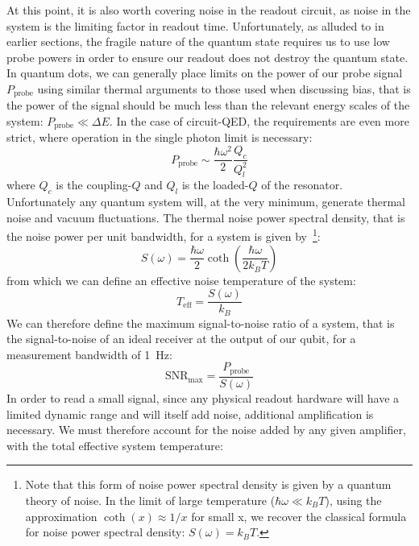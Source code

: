 At this point, it is also worth covering noise in the readout circuit, as noise in the system is the limiting factor in readout time. Unfortunately, as alluded
to in earlier sections, the fragile nature of the quantum state requires us to use low probe powers in order to ensure our readout does not destroy the quantum
state. In quantum dots, we can generally place limits on the power of our probe signal $P_\textrm{probe}$ using similar thermal arguments to those used when discussing
bias, that is the power of the signal should be much less than the relevant energy scales of the system: $P_\textrm{probe} \ll \Delta E$. In the case of circuit-QED,
the requirements are even more strict, where operation in the single photon limit is necessary:
\begin{equation}
  P_\textrm{probe} \sim \frac{\hbar \omega^2}{2} \frac{Q_c}{Q_l^2}
\end{equation}
where $Q_c$ is the coupling-$Q$ and $Q_l$ is the loaded-$Q$ of the resonator. Unfortunately any quantum system will, at the very minimum, generate thermal noise and
vacuum fluctuations. The thermal noise power spectral density, that is the noise power per unit bandwidth, for a system is given
by~\cite{RevModPhys.82.1155}\footnote{Note that this form of noise power spectral density is given by a quantum theory of noise. In the limit
of large temperature ($\hbar\omega \ll k_BT$), using the approximation $\coth (x) \approx 1/x$ for small x, we recover the classical formula for noise power
spectral density: $S(\omega) = k_B T$.}:
\begin{equation}
  S(\omega) = \frac{\hbar \omega}{2}\coth\left(\frac{\hbar\omega}{2k_BT}\right)
\end{equation}
from which we can define an effective noise temperature of the system:
\begin{equation}
  T_\textrm{eff} = \frac{S(\omega)}{k_B}
\end{equation}
We can therefore define the maximum signal-to-noise ratio of a system, that is the signal-to-noise of an ideal receiver at the output of our qubit, for a measurement
bandwidth of \SI{1}{\hertz}:
\begin{equation}
  \textrm{SNR}_\textrm{max} = \frac{P_\textrm{probe}}{S(\omega)}
\end{equation}
In order to read a small signal, since any physical readout hardware will have a limited dynamic range and will itself add noise, additional amplification is necessary.
We must therefore account for the noise added by any given amplifier, with the total effective system temperature:
